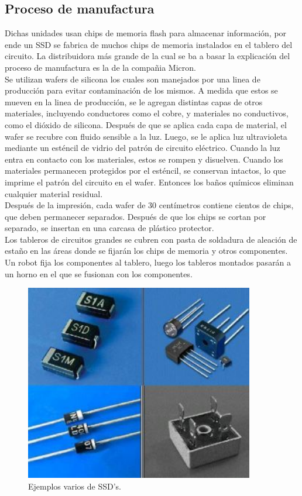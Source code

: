 \documentclass[letterpaper, 12pt]{article}
\begin{document}
\begin{justify}
        \subsection{Proceso de manufactura}
        Dichas unidades usan chips de memoria flash para almacenar información, por ende un SSD se fabrica de muchos chips de memoria instalados en el tablero del circuito. La distribuidora más grande de la cual se ba a basar la explicación
        del proceso de manufactura es la de la compañia Micron.
        \\\newline
        Se utilizan wafers de silicona los cuales son manejados por una linea de producción para evitar contaminación de los mismos. A medida que estos se mueven en la linea de producción, se le agregan distintas capas de otros materiales, incluyendo conductores
        como el cobre, y materiales no conductivos, como el dióxido de silicona. Después de que se aplica cada capa de material, el wafer se recubre con fluido sensible a la luz. Luego, se le aplica luz ultravioleta mediante un esténcil de vidrio del patrón de circuito eléctrico.
        Cuando la luz entra en contacto con los materiales, estos se rompen y disuelven. Cuando los materiales permanecen protegidos por el esténcil, se conservan intactos, lo que imprime el patrón del circuito en el wafer. Entonces los baños químicos eliminan cualquier material residual.
        \\\newline
        Después de la impresión, cada wafer de 30 centímetros contiene cientos de chips, que deben permanecer separados. Después de que los chips se cortan por separado, se insertan en una carcasa de plástico protector.
        \\\newline
        Los tableros de circuitos grandes se cubren con pasta de soldadura de aleación de estaño en las áreas donde se fijarán los chips de memoria y otros componentes. Un robot fija los componentes al tablero, luego los tableros montados pasarán a un horno en el que se fusionan con los componentes.
        \begin{figure}[H]
            \centering
            \includegraphics[width=10cm]{ssd.jpg}
            \caption{Ejemplos varios de SSD's.}
            \label{fig:SSDS}
        \end{figure}

\end{justify}
\end{document}
